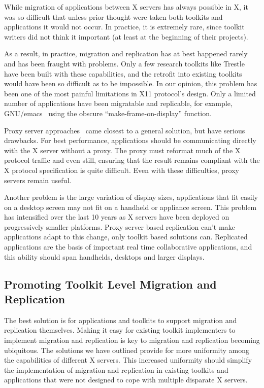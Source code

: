 \documentclass[twocolumn]{article}
\begin{document}
While migration of applications between X servers has always possible
in X, it was so difficult that unless prior thought were taken both
toolkits and applications it would not occur. In practice, it is
extremely rare, since toolkit writers did not think it important (at
least at the beginning of their projects).

As a result, in practice, migration and replication has at best
happened rarely and has been fraught with problems.  Only a few
research toolkits like Trestle~\cite{trestle:1991} have been built
with these capabilities, and the retrofit into existing toolkits would
have been so difficult as to be impossible.  In our opinion, this
problem has been one of the most painful limitations in X11
protocol's design. Only a limited number of applications have been
migratable and replicable, for example, GNU/emacs~\cite{emacs} using
the obscure ``make-frame-on-display'' function.

Proxy server approaches~\cite{SharedX:1994} came closest to a general solution,
but have serious drawbacks.  For best performance, applications should
be communicating directly with the X server without a proxy.  The proxy must
reformat much of the X protocol traffic and even still, ensuring that the
result remains compliant with the X protocol specification is quite
difficult.  Even with these difficulties, proxy servers remain useful.

Another problem is the large variation of display sizes, applications that
fit easily on a desktop screen may not fit on a handheld or appliance
screen.  This problem has intensified over the last 10 years as X servers
have been deployed on progressively smaller platforms. Proxy server based
replication can't make applications adapt to this change, only toolkit based
solutions can.  Replicated applications are the basis of important real
time collaborative applications, and this ability should span handhelds,
desktops and larger displays.

\subsection{Promoting Toolkit Level Migration and Replication}

The best solution is for applications and toolkits to support migration and
replication themselves.  Making it easy for existing toolkit implementers to
implement migration and replication is key to migration and replication
becoming ubiquitous.  The solutions we have outlined provide for more
uniformity among the capabilities of different X servers.  This increased
uniformity should simplify the implementation of migration and replication in
existing toolkits and applications that were not designed to cope with
multiple disparate X servers.
\end{document}
